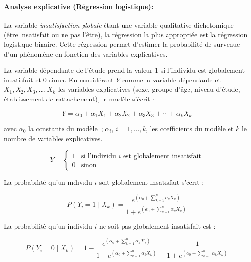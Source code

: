\documentclass[
12pt,          %
a4paper,       %
oneside,      %
openright      %
]{report}          %
\begin{document}
			
			\paragraph{Analyse explicative (Régression logistique):} La variable \textit{insatisfaction globale} étant une variable qualitative dichotomique (être insatisfait ou ne pas l'être), la régression la plus appropriée est la régression logistique binaire. Cette régression permet d'estimer la probabilité de survenue d'un phénomène en fonction des variables explicatives.
			
			La variable dépendante de l'étude prend la valeur 1 si l'individu est globalement insatisfait et 0 sinon. En considérant $Y$ comme la variable dépendante et $X_1, X_2, X_3, \ldots, X_k$ les variables explicatives (sexe, groupe d'âge, niveau d'étude, établissement de rattachement), le modèle s'écrit :
			
			\begin{equation}
				Y = \alpha_0 + \alpha_1 X_1 + \alpha_2 X_2 + \alpha_3 X_3 + \cdots + \alpha_k X_k
			\end{equation}
			
			\noindent avec $\alpha_0$ la constante du modèle~; $\alpha_i$, $i = 1, \ldots, k$, les coefficients du modèle et $k$ le nombre de variables explicatives.
			
			\[
			Y = \begin{cases}
				1 & \text{si l'individu } i \text{ est globalement insatisfait} \\
				0 & \text{sinon}
			\end{cases}
			\]
			
			La probabilité qu'un individu $i$ soit globalement insatisfait s'écrit :
			
			\begin{equation}
				P(Y_i = 1 \mid X_k) = \frac{e^{\left(\alpha_0 + \sum_{k=1}^{n} \alpha_k X_k\right)}}{1 + 	e^{\left(\alpha_0 + \sum_{k=1}^{n} \alpha_k X_k\right)}}
			\end{equation}
			
			La probabilité qu'un individu $i$ ne soit pas globalement insatisfait est :
			
			\begin{equation}
				P(Y_i = 0 \mid X_k) = 1 - \frac{e^{\left(\alpha_0 + \sum_{k=1}^{n} \alpha_k X_k\right)}}{1 + 	e^{\left(\alpha_0 + \sum_{k=1}^{n} \alpha_k X_k\right)}} = \frac{1}{1 + e^{\left(\alpha_0 + \sum_{k=1}^{n} \alpha_k X_k\right)}}
			\end{equation}
			
\end{document}
